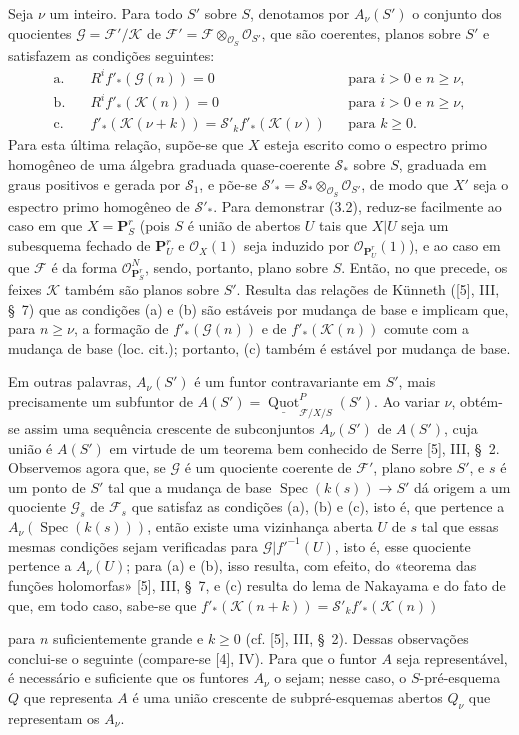 \documentclass[11pt,twoside,openany]{book}
\numberwithin{equation}{section}
\newcommand{\src}[1]{%
  \phantomsection\hypertarget{src:#1}{}%
  \marginpar{\raggedleft\footnotesize\sffamily #1}%
}
\theoremstyle{plain}
\theoremstyle{definition}
\theoremstyle{remark}
\newcommand{\FgaUnitKey}{frontmatter}
\renewcommand{\src}[1]{%
  \phantomsection\hypertarget{src:\FgaUnitKey:#1}{}%
  \marginpar{\raggedleft\footnotesize\sffamily #1}%
}
\begin{document}
Seja $\nu$ um inteiro. Para todo $S'$ sobre $S$, denotamos por $A_\nu(S')$ o
conjunto dos quocientes $\mathcal G=\mathcal F'/\mathcal K$ de
$\mathcal F'=\mathcal F\otimes_{\mathcal O_S}\mathcal O_{S'}$, que são
coerentes, planos sobre $S'$ e satisfazem as condições seguintes:
\begin{align*}
\text{a.}\quad &R^if'_*(\mathcal G(n))=0 &&\text{para $i>0$ e $n\geq\nu$},\\
\text{b.}\quad &R^if'_*(\mathcal K(n))=0 &&\text{para $i>0$ e $n\geq\nu$},\\
\text{c.}\quad &f'_*(\mathcal K(\nu+k))
=\mathcal S'_k f'_*(\mathcal K(\nu)) &&\text{para $k\geq0$}.
\end{align*}
Para esta última relação, supõe-se que $X$ esteja escrito como o espectro primo
homogêneo de uma álgebra graduada quase-coerente $\mathcal S_*$ sobre $S$,
graduada em graus positivos e gerada por $\mathcal S_1$, e põe-se
$\mathcal S'_* =\mathcal S_*\otimes_{\mathcal O_S}\mathcal O_{S'}$, de modo
que $X'$ seja o espectro primo homogêneo de $\mathcal S'_*$. Para demonstrar
(3.2), reduz-se facilmente ao caso em que $X=\mathbf P^r_S$ (pois $S$ é união
de abertos $U$ tais que $X|U$ seja um subesquema fechado de $\mathbf P^r_U$ e
$\mathcal O_X(1)$ seja induzido por $\mathcal O_{\mathbf P^r_U}(1)$), e ao
caso em que $\mathcal F$ é da forma
$\mathcal O_{\mathbf P^r_S}^{N}$, sendo, portanto, plano sobre $S$. Então, no
que precede, os feixes $\mathcal K$ também são planos sobre $S'$. Resulta das
relações de Künneth ([5], III, \S~7) que as condições (a) e (b) são estáveis
por mudança de base e implicam que, para $n\geq\nu$, a formação de
$f'_*(\mathcal G(n))$ e de $f'_*(\mathcal K(n))$ comute com a mudança de base
(loc. cit.); portanto, (c) também é estável por mudança de base.

Em outras palavras, $A_\nu(S')$ é um funtor contravariante em $S'$, mais
precisamente um subfuntor de
$A(S')=\underline{\operatorname{Quot}}^P_{\mathcal F/X/S}(S')$. Ao variar
$\nu$, obtém-se assim uma sequência crescente de subconjuntos $A_\nu(S')$ de
$A(S')$, cuja união é $A(S')$ em virtude de um teorema bem conhecido de
Serre [5], III, \S~2. Observemos agora que, se $\mathcal G$ é um quociente
coerente de $\mathcal F'$, plano sobre $S'$, e $s$ é um ponto de $S'$ tal que
a mudança de base $\operatorname{Spec}(k(s))\longrightarrow S'$ dá origem a
um quociente $\mathcal G_s$ de $\mathcal F_s$ que satisfaz as condições (a),
(b) e (c), isto é, que pertence a $A_\nu(\operatorname{Spec}(k(s)))$, então
existe uma vizinhança aberta $U$ de $s$ tal que essas mesmas condições sejam
verificadas para $\mathcal G|f'^{-1}(U)$, isto é, esse quociente pertence a
$A_\nu(U)$; para (a) e (b), isso resulta, com efeito, do «teorema das funções
holomorfas» [5], III, \S~7, e (c) resulta do lema de Nakayama e do fato de que,
em todo caso, sabe-se que
$f'_*(\mathcal K(n+k))=\mathcal S'_k f'_*(\mathcal K(n))$
\src{261}
para $n$ suficientemente grande e $k\geq0$ (cf. [5], III, \S~2). Dessas
observações conclui-se o seguinte (compare-se [4], IV). Para que o funtor $A$
seja representável, é necessário e suficiente que os funtores $A_\nu$ o sejam;
nesse caso, o $S$-pré-esquema $Q$ que representa $A$ é uma união crescente de
subpré-esquemas abertos $Q_\nu$ que representam os $A_\nu$.
\end{document}

